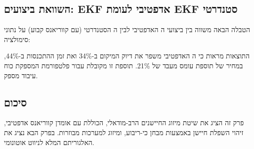 \subsection{השוואת ביצועים: EKF אדפטיבי לעומת EKF סטנדרטי}
\label{sec:ch05_comparison}

הטבלה הבאה משווה בין ביצועי ה האדפטיבי לבין ה הסטנדרטי (עם קווריאנס קבוע) על נתוני סימולציה:

\begin{table}[htbp]
\centering
\caption{השוואת ביצועים: EKF אדפטיבי לעומת EKF סטנדרטי. (Performance comparison: Adaptive EKF vs. standard EKF.)}
\label{tab:ch05_ekf_comparison}
\end{table}

התוצאות מראות כי ה האדפטיבי משפר את דיוק המיקום ב-34\% ואת זמן ההתכנסות ב-44\%, במחיר של תוספת עומס מעבד של 21\%. תוספת זו מקובלת עבור פלטפורמת  המספקת כוח עיבוד מספק. \cite{CrewAIDocs} \cite{Thrun2005ProbRobotics}

\subsection{סיכום}
\label{sec:ch05_summary}

פרק זה הציג את שיטת מיזוג החיישנים הרב-מודאלי, הכוללת  עם אומדן קווריאנס אדפטיבי, זיהוי השפלת חיישן באמצעות מבחן כי-ריבוע, ומיזוג  למערכות מבוזרות. בפרק הבא נציג את האלגוריתם המלא לניווט אוטונומי. \cite{Kalman1960} \cite{Julier1997CovarianceIntersection} \cite{CrewAIDocs}

